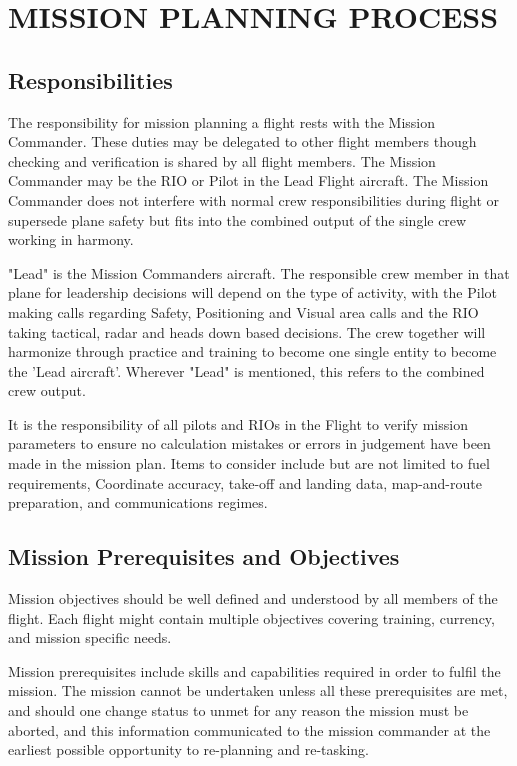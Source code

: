\section{MISSION PLANNING PROCESS}

\subsection{Responsibilities}

The responsibility for mission planning a flight rests with the Mission
Commander. These duties may be delegated to other flight members though checking
and verification is shared by all flight members. The Mission Commander may be
the RIO or Pilot in the Lead Flight aircraft. The Mission Commander does not
interfere with normal crew responsibilities during flight or supersede plane
safety but fits into the combined output of the single crew working in harmony.

"Lead" is the Mission Commanders aircraft. The responsible crew member in that
plane for leadership decisions will depend on the type of activity, with the
Pilot making calls regarding Safety, Positioning and Visual area calls and the
RIO taking tactical, radar and heads down based decisions. The crew together
will harmonize through practice and training to become one single entity to
become the 'Lead aircraft'. Wherever "Lead" is mentioned, this refers to the
combined crew output.

It is the responsibility of all pilots and RIOs in the Flight to verify mission
parameters to ensure no calculation mistakes or errors in judgement have been
made in the mission plan. Items to consider include but are not limited to fuel
requirements, Coordinate accuracy, take-off and landing data, map-and-route
preparation, and communications regimes.

\subsection{Mission Prerequisites and Objectives}

Mission objectives should be well defined and understood by all members of the
flight. Each flight might contain multiple objectives covering training,
currency, and mission specific needs.

Mission prerequisites include skills and capabilities required in order to
fulfil the mission. The mission cannot be undertaken unless all these
prerequisites are met, and should one change status to unmet for any reason
the mission must be aborted, and this information communicated to the mission
commander at the earliest possible opportunity to re-planning and re-tasking.


